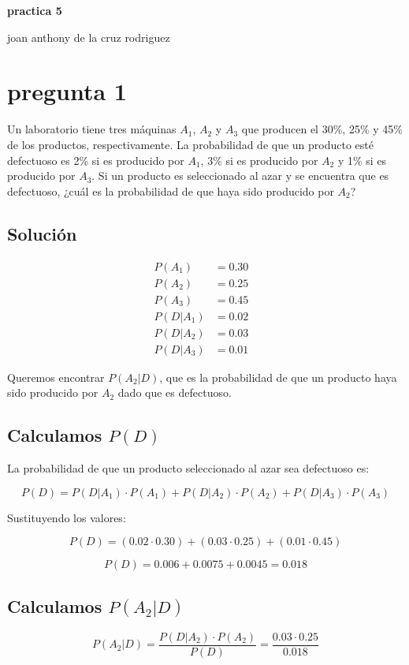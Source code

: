 \documentclass[12pt,a4paper]{article}
\begin{document}
\begin{center}
\textbf{practica 5}
\end{center}
joan anthony de la cruz rodriguez
\section*{pregunta 1}
Un laboratorio tiene tres máquinas \( A_1 \), \( A_2 \) y \( A_3 \) que producen el 30\%, 25\% y 45\% de los productos, respectivamente. La probabilidad de que un producto esté defectuoso es 2\% si es producido por \( A_1 \), 3\% si es producido por \( A_2 \) y 1\% si es producido por \( A_3 \). Si un producto es seleccionado al azar y se encuentra que es defectuoso, ¿cuál es la probabilidad de que haya sido producido por \( A_2 \)?

\subsection*{Solución}
\begin{align*}
P(A_1) &= 0.30 &\\
P(A_2) &= 0.25 &\\
P(A_3) &= 0.45 &\\
P(D|A_1) &= 0.02 &\\
P(D|A_2) &= 0.03 &\\
P(D|A_3) &= 0.01 &
\end{align*}

Queremos encontrar \( P(A_2|D) \), que es la probabilidad de que un producto haya sido producido por \( A_2 \) dado que es defectuoso.

\subsection*{Calculamos \( P(D) \)}
La probabilidad de que un producto seleccionado al azar sea defectuoso es:

\[
P(D) = P(D|A_1) \cdot P(A_1) + P(D|A_2) \cdot P(A_2) + P(D|A_3) \cdot P(A_3)
\]

Sustituyendo los valores:

\[
P(D) = (0.02 \cdot 0.30) + (0.03 \cdot 0.25) + (0.01 \cdot 0.45)
\]

\[
P(D) = 0.006 + 0.0075 + 0.0045 = 0.018
\]

\subsection*{ Calculamos \( P(A_2|D) \)}

\[
P(A_2|D) = \frac{P(D|A_2) \cdot P(A_2)}{P(D)} = \frac{0.03 \cdot 0.25}{0.018}
\]
\end{document}
